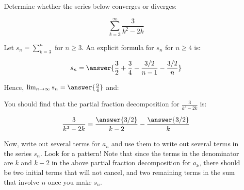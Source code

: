 \documentclass{ximera}
\author{Jim Talamo}
\begin{document}
\begin{exercise}
Determine whether the series below converges or diverges:

\[
\sum_{k=3}^{\infty} \frac{3}{k^2-2k}
\]

Let $s_n = \sum_{k=3}^{n}$ for $n \geq3$. An explicit formula for $s_n$ for $n \geq 4 $ is:

\[
s_n = \answer{\frac{3}{2}+\frac{3}{4} - \frac{3/2}{n-1}-\frac{3/2}{n}}
\]

\begin{exercise}
Hence, $\lim_{n \to \infty} s_n = \answer{\frac{9}{4}}$ and:

\begin{multipleChoice}
\end{multipleChoice}

\begin{hint}
You should find that the partial fraction decomposition for $\frac{3}{k^2-2k}$ is:

\[
\frac{3}{k^2-2k} = \frac{\answer{3/2}}{k-2}-\frac{\answer{3/2}}{k}
\]

Now, write out several terms for $a_n$ and use them to write out several terms in the series $s_n$.  Look for a pattern!  Note that since the terms in the denominator are $k$ and $k-2$ in the above partial fraction decomposition for $a_k$, there should be two initial terms that will not cancel, and two remaining terms in the sum that involve $n$ once you make $s_n$.
\end{hint}

\end{exercise}
\end{exercise}
\end{document}
